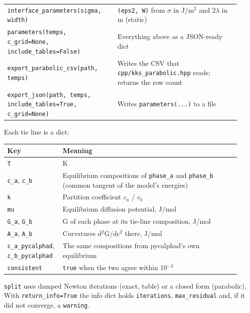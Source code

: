 \documentclass[12pt,a4paper]{article}
\begin{document}
\begin{longtable}{>{\raggedright\arraybackslash}p{0.448\linewidth}>{\raggedright\arraybackslash}p{0.499\linewidth}}
\texttt{interface\_\allowbreak{}parameters(sigma,\allowbreak{} width)} & \texttt{(eps2,\allowbreak{} W)} from \(\sigma\) in J/m\(^{2}\) and 2\(\lambda\) in m (static) \\
\texttt{parameters(temps,\allowbreak{} c\_\allowbreak{}grid=None,\allowbreak{} include\_\allowbreak{}tables=False)} & Everything above as a JSON-ready dict \\
\texttt{export\_\allowbreak{}parabolic\_\allowbreak{}csv(path,\allowbreak{} temps)} & Writes the CSV that \texttt{cpp/\allowbreak{}kks\_\allowbreak{}parabolic.\allowbreak{}hpp} reads; returns the row count \\
\texttt{export\_\allowbreak{}json(path,\allowbreak{} temps,\allowbreak{} include\_\allowbreak{}tables=True,\allowbreak{} c\_\allowbreak{}grid=None)} & Writes \texttt{parameters(.\allowbreak{}.\allowbreak{}.\allowbreak{})} to a file \\
\bottomrule
\end{longtable}
\endgroup
Each tie line is a dict:

\begingroup\small
\begin{longtable}{>{\raggedright\arraybackslash}p{0.207\linewidth}>{\raggedright\arraybackslash}p{0.740\linewidth}}
\toprule
\textbf{Key} & \textbf{Meaning} \\
\midrule
\endhead
\texttt{T} & K \\
\texttt{c\_\allowbreak{}a}, \texttt{c\_\allowbreak{}b} & Equilibrium compositions of \texttt{phase\_\allowbreak{}a} and \texttt{phase\_\allowbreak{}b} (common tangent of the model's energies) \\
\texttt{k} & Partition coefficient \(c_{a}\) / \(c_{b}\) \\
\texttt{mu} & Equilibrium diffusion potential, J/mol \\
\texttt{G\_\allowbreak{}a}, \texttt{G\_\allowbreak{}b} & G of each phase at its tie-line composition, J/mol \\
\texttt{A\_\allowbreak{}a}, \texttt{A\_\allowbreak{}b} & Curvatures d\(^{2}\)G/dc\(^{2}\) there, J/mol \\
\texttt{c\_\allowbreak{}a\_\allowbreak{}pycalphad}, \texttt{c\_\allowbreak{}b\_\allowbreak{}pycalphad} & The same compositions from pycalphad's own equilibrium \\
\texttt{consistent} & \texttt{true} when the two agree within 10\(^{-3}\) \\
\bottomrule
\end{longtable}
\endgroup
\texttt{split} uses damped Newton iterations (exact, table) or a closed form (parabolic). With \texttt{return\_\allowbreak{}info=True} the info dict holds \texttt{iterations}, \texttt{max\_\allowbreak{}residual} and, if it did not converge, a \texttt{warning}.
\end{document}
